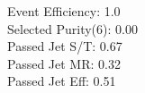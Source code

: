 Event Efficiency:   1.0\\ 
Selected Purity(6): 0.00\\ 
Passed Jet S/T:     0.67\\ 
Passed Jet MR:      0.32\\ 
Passed Jet Eff:     0.51